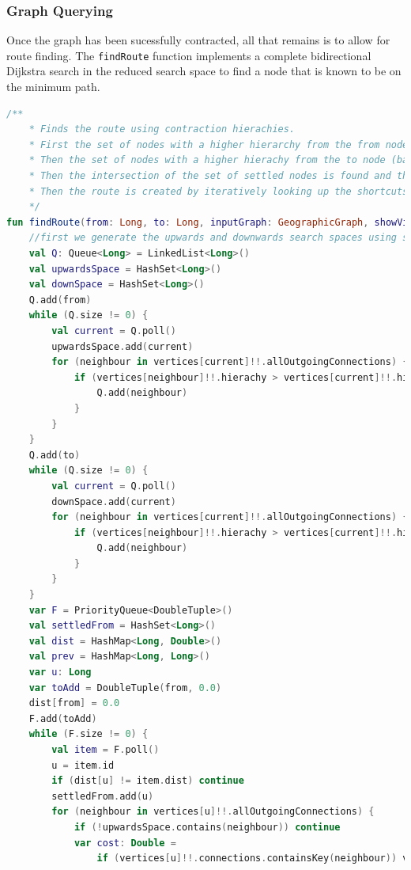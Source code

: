 \documentclass[11pt,twoside,a4paper]{report}
\begin{document}
\subsubsection{Graph Querying}
Once the graph has been sucessfully contracted, all that remains is to allow for route finding. 
The \texttt{findRoute} function implements a complete bidirectional Dijkstra search in the reduced search space to find a node that is known to be on the minimum path.
\begin{lstlisting}[language=kotlin]
/**
    * Finds the route using contraction hierachies.
    * First the set of nodes with a higher hierarchy from the from node are calculated
    * Then the set of nodes with a higher hierachy from the to node (backwards) are calculated
    * Then the intersection of the set of settled nodes is found and the minimum found
    * Then the route is created by iteratively looking up the shortcuts
    */
fun findRoute(from: Long, to: Long, inputGraph: GeographicGraph, showVisited: Boolean): List<Long> {
    //first we generate the upwards and downwards search spaces using simple queues
    val Q: Queue<Long> = LinkedList<Long>()
    val upwardsSpace = HashSet<Long>()
    val downSpace = HashSet<Long>()
    Q.add(from)
    while (Q.size != 0) {
        val current = Q.poll()
        upwardsSpace.add(current)
        for (neighbour in vertices[current]!!.allOutgoingConnections) {
            if (vertices[neighbour]!!.hierachy > vertices[current]!!.hierachy && !upwardsSpace.contains(neighbour)) {
                Q.add(neighbour)
            }
        }
    }
    Q.add(to)
    while (Q.size != 0) {
        val current = Q.poll()
        downSpace.add(current)
        for (neighbour in vertices[current]!!.allOutgoingConnections) {
            if (vertices[neighbour]!!.hierachy > vertices[current]!!.hierachy && !downSpace.contains(neighbour)) {
                Q.add(neighbour)
            }
        }
    }
    var F = PriorityQueue<DoubleTuple>()
    val settledFrom = HashSet<Long>()
    val dist = HashMap<Long, Double>()
    val prev = HashMap<Long, Long>()
    var u: Long
    var toAdd = DoubleTuple(from, 0.0)
    dist[from] = 0.0
    F.add(toAdd)
    while (F.size != 0) {
        val item = F.poll()
        u = item.id
        if (dist[u] != item.dist) continue
        settledFrom.add(u)
        for (neighbour in vertices[u]!!.allOutgoingConnections) {
            if (!upwardsSpace.contains(neighbour)) continue
            var cost: Double =
                if (vertices[u]!!.connections.containsKey(neighbour)) vertices[u]!!.connections[neighbour]!!

\end{lstlisting}
\end{document}
